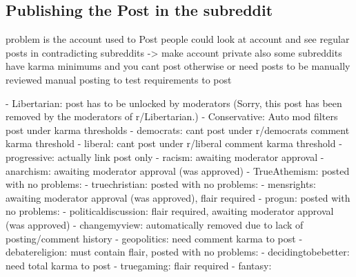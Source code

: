 \subsection{Publishing the Post in the subreddit}

problem is the account used to Post
people could look at account and see regular posts in contradicting subreddits -> make account private
also some subreddits have karma minimums and you cant post otherwise or need posts to be manually reviewed
manual posting to test requirements to post




- Libertarian: post has to be unlocked by moderators (Sorry, this post has been removed by the moderators of r/Libertarian.)
- Conservative: Auto mod filters post under karma thresholds
- democrats: cant post under r/democrats comment karma threshold
- liberal: cant post under r/liberal comment karma threshold
- progressive: actually link post only
- racism: awaiting moderator approval
- anarchism: awaiting moderator approval (was approved) 
- TrueAthemism: posted with no problems: 
- truechristian: posted with no problems: 
- mensrights: awaiting moderator approval (was approved), flair required 
- progun: posted with no problems: 
- politicaldiscussion: flair required, awaiting moderator approval (was approved) 
- changemyview: automatically removed due to lack of posting/comment history
- geopolitics: need comment karma to post
- debatereligion: must contain flair, posted with no problems: 
- decidingtobebetter: need total karma to post
- truegaming:  flair required
- fantasy: 

